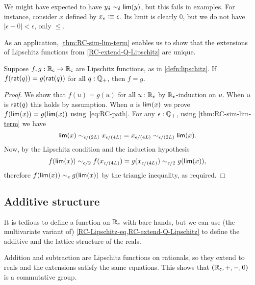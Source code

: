 \begin{rmk}
  We might have expected to have $y_\delta \sim_{\delta} \mathsf{lim}(y)$, but this fails in examples.
  For instance, consider $x$ defined by $x_\epsilon \vcentcolon\equiv \epsilon$.
  Its limit is clearly $0$, but we do not have $|\epsilon - 0 |<\epsilon$, only $\le$.
\end{rmk}

As an application, \autoref{thm:RC-sim-lim-term} enables us to show that the extensions of Lipschitz functions from \autoref{RC-extend-Q-Lipschitz} are unique.

\begin{lem} \label{RC-Lipschitz-eq}
  Suppose $f,g : \mathbb{R}_\mathsf{c} \to \mathbb{R}_\mathsf{c}$ are Lipschitz functions, as in \autoref{defn:lipschitz}.
  If $f(\mathsf{rat}(q)) = g(\mathsf{rat}(q))$ for all $q : \mathbb{Q}_{+}$, then $f = g$.
\end{lem}

\begin{proof}
  We show that $f(u) = g(u)$ for all $u : \mathbb{R}_\mathsf{c}$ by $\mathbb{R}_\mathsf{c}$-induction on $u$. When $u$ is
  $\mathsf{rat}(q)$ this holds by assumption. When $u$ is $\mathsf{lim}(x)$ we prove $f(\mathsf{lim}(x)) =
  g(\mathsf{lim}(x))$ using~\eqref{eq:RC-path}. For any $\epsilon : \mathbb{Q}_{+}$, using \autoref{thm:RC-sim-lim-term} we have
  \begin{equation*}
    \mathsf{lim}(x) \sim_{\epsilon/(2 L)}
    x_{\epsilon/(4 L)} =
    x_{\epsilon/(4 L)} \sim_{\epsilon/(2 L)}
    \mathsf{lim}(x).
  \end{equation*}
  Now, by the Lipschitz condition and the induction hypothesis
  \begin{equation*}
    f(\mathsf{lim}(x)) \sim_{\epsilon/2}
    f(x_{\epsilon/(4L)}) =
    g(x_{\epsilon/(4L)}) \sim_{\epsilon/2}
    g(\mathsf{lim}(x)),
  \end{equation*}
  therefore $f(\mathsf{lim}(x)) \sim_\epsilon g(\mathsf{lim}(x))$ by the triangle inequality, as required.
\end{proof}


\subsection{Additive structure}
\label{sec:additive-structure-order}

It is tedious to define a function on $\mathbb{R}_\mathsf{c}$ with bare hands, but we can use (the
multivariate variant of) \autoref{RC-Lipschitz-eq,RC-extend-Q-Lipschitz} to define the
additive and the lattice structure of the reals.

Addition and subtraction are Lipschitz functions on rationals, so they extend to reals and
the extensions satisfy the same equations. This shows that $(\mathbb{R}_\mathsf{c}, {+}, {-}, 0)$ is a
commutative group.

